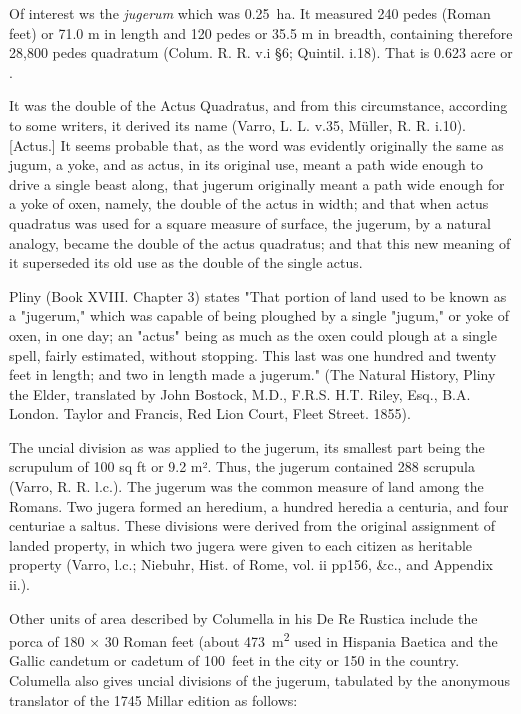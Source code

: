 Of interest ws the \textit{jugerum} which was \SI{0.25}{ha}. It measured 240 pedes (Roman feet) or 71.0 m in length and 120 pedes or 35.5 m in breadth, containing therefore 28,800 pedes quadratum (Colum. R. R. v.i \S 6; Quintil. i.18). That is 0.623 acre or .

It was the double of the Actus Quadratus, and from this circumstance, according to some writers, it derived its name (Varro, L. L. v.35, M\"uller, R. R. i.10). [Actus.] It seems probable that, as the word was evidently originally the same as jugum, a yoke, and as actus, in its original use, meant a path wide enough to drive a single beast along, that jugerum originally meant a path wide enough for a yoke of oxen, namely, the double of the actus in width; and that when actus quadratus was used for a square measure of surface, the jugerum, by a natural analogy, became the double of the actus quadratus; and that this new meaning of it superseded its old use as the double of the single actus.

Pliny (Book XVIII. Chapter 3) states "That portion of land used to be known as a "jugerum," which was capable of being ploughed by a single "jugum," or yoke of oxen, in one day; an "actus" being as much as the oxen could plough at a single spell, fairly estimated, without stopping. This last was one hundred and twenty feet in length; and two in length made a jugerum." (The Natural History, Pliny the Elder, translated by John Bostock, M.D., F.R.S. H.T. Riley, Esq., B.A. London. Taylor and Francis, Red Lion Court, Fleet Street. 1855).

The uncial division as was applied to the jugerum, its smallest part being the scrupulum of 100 sq ft or 9.2 m². Thus, the jugerum contained 288 scrupula (Varro, R. R. l.c.). The jugerum was the common measure of land among the Romans. Two jugera formed an heredium, a hundred heredia a centuria, and four centuriae a saltus. These divisions were derived from the original assignment of landed property, in which two jugera were given to each citizen as heritable property (Varro, l.c.; Niebuhr, Hist. of Rome, vol. ii pp156, \&c., and Appendix ii.).

Other units of area described by Columella in his De Re Rustica include the porca of 180 × 30 Roman feet (about \SI{473}{\square\meter} used in Hispania Baetica and the Gallic candetum or cadetum of \SI{100}{feet} in the city or 150 in the country. Columella also gives uncial divisions of the jugerum, tabulated by the anonymous translator of the 1745 Millar edition as follows:

